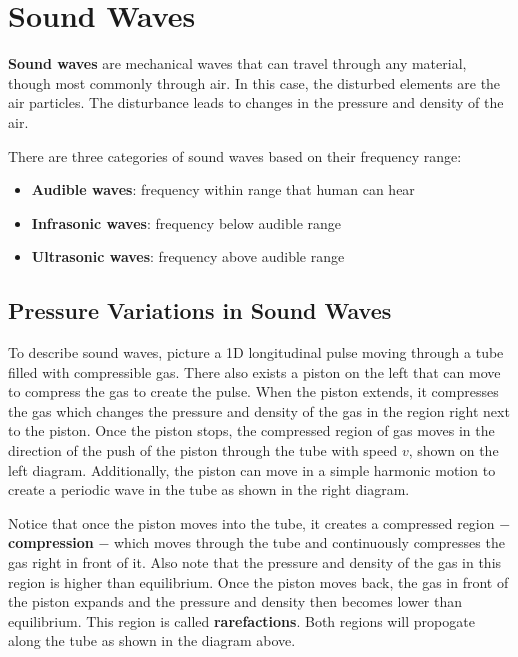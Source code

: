 \chapter{Sound Waves}

\textbf{Sound waves} are mechanical waves that can travel through any material, though 
most commonly through air. In this case, the disturbed elements are the air particles.
The disturbance leads to changes in the pressure and density of the air.

There are three categories of sound waves based on their frequency range:
\begin{itemize}
    \item \textbf{Audible waves}: frequency within range that human can hear
    \item \textbf{Infrasonic waves}: frequency below audible range
    \item \textbf{Ultrasonic waves}: frequency above audible range
\end{itemize}

\section{Pressure Variations in Sound Waves}

To describe sound waves, picture a 1D longitudinal pulse moving through a tube filled with 
compressible gas. There also exists a piston on the left that can move to compress the gas to 
create the pulse. When the piston extends, it compresses the gas which changes the pressure and 
density of the gas in the region right next to the piston. Once the piston stops, the compressed 
region of gas moves in the direction of the push of the piston through the tube with speed $v$,
shown on the left diagram. Additionally, the piston can move in a simple harmonic motion
to create a periodic wave in the tube as shown in the right diagram.

Notice that once the piston moves into the tube, it creates a compressed region $-$ \textbf{compression}
$-$ which moves through the tube and continuously compresses the gas right in front of it. Also note 
that the pressure and density of the gas in this region is higher than equilibrium.
Once the piston moves back, the gas in front of the piston expands and the pressure and density then 
becomes lower than equilibrium. This region is called \textbf{rarefactions}. Both regions will
propogate along the tube as shown in the diagram above.

